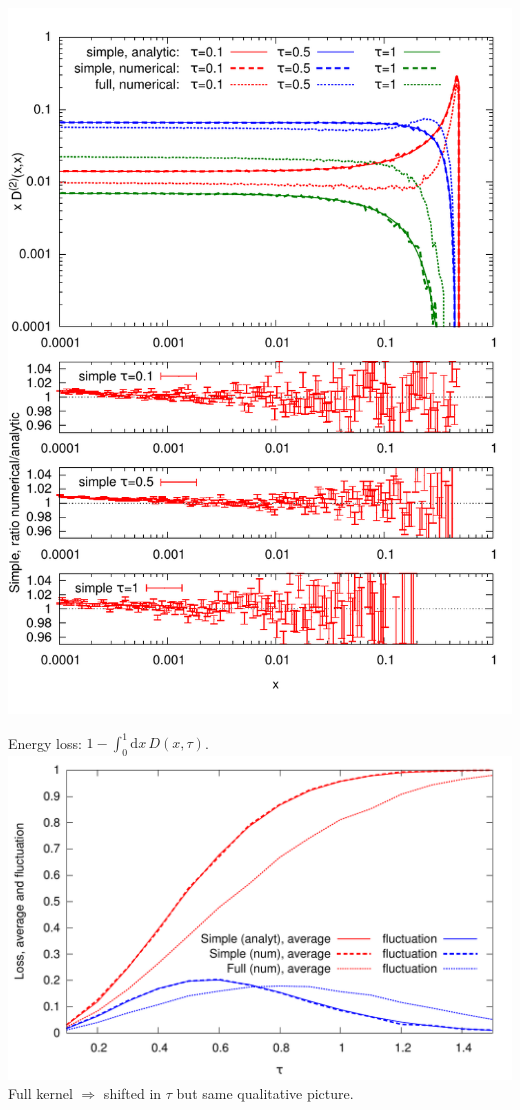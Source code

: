\documentclass[pstricks,mathserif]{beamer}
\begin{document}
\begin{frame}
\includegraphics[width=1\linewidth]{D2.pdf}
\endminipage\hfill


\end{frame}



\begin{frame}
Energy loss: $1 - \int_0^1 \mathrm{d}x\, D(x,\tau) $.
{\centering
\includegraphics[width=1\linewidth]{energyloss.pdf}
}
Full kernel $\Rightarrow$ shifted in $\tau$ but same qualitative picture.
\end{frame}
\end{document}
